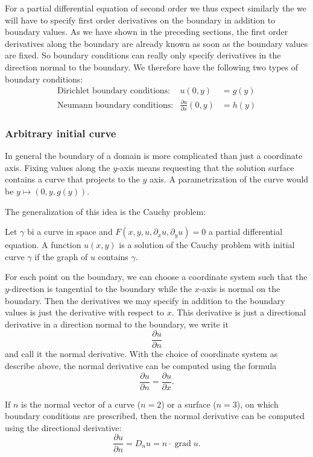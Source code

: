 For a partial differential equation of second order we thus expect 
similarly the we will have to specify first order derivatives on the
boundary in addition to boundary values.
As we have shown in the preceding sections, the first order derivatives
along the boundary are already known as soon as the boundary values are
fixed.
So boundary conditions can really only specify derivatives in the direction
normal to the boundary.
We therefore have the following two types of boundary conditions:
\begin{align}
&\text{Dirichlet boundary conditions:}&
u(0,y)&=g(y)&
\label{klassifikation:dirichlet-randbedingung}
\\
&\text{Neumann boundary conditions:}&
\frac{\partial u}{\partial x}(0,y)&=h(y)
\label{klassifikation:neumann-randbedingung}
\end{align}

\subsubsection{Arbitrary initial curve}
In general the boundary of a domain is more complicated than just 
a coordinate axis.
Fixing values along the $y$-axis means requesting that the solution
surface contains a curve that projects to the $y$ axis.
A parametrization of the curve would be $y\mapsto (0,y,g(y))$.

The generalization of this idea is the Cauchy problem:

\begin{problem}
Let $\gamma$ bi a curve in space and 
$F(x,y,u,\partial_xu,\partial_yu)=0$ a partial differential equation.
A function $u(x,y)$ is a solution of the Cauchy problem with initial
curve $\gamma$ if the graph of $u$ contains $\gamma$.
\end{problem}

For each point on the boundary, we can choose a coordinate system such
that the $y$-direction is tangential to the boundary while the $x$-axis
is normal on the boundary.
Then the derivatives we may specify in addition to the boundary
values is just the derivative with respect to $x$.
This derivative is just a directional derivative in a direction normal
to the boundary, we write it
\[
\frac{\partial u}{\partial n}
\]
and call it the normal derivative.
With the choice of coordinate system as describe above, the normal
derivative can be computed using the formula
\[
\frac{\partial u}{\partial n}
=\frac{\partial u}{\partial x}.
\]

If $n$ is the normal vector of a curve ($n=2$) or a surface ($n=3$),
on which boundary conditions are prescribed, then the normal derivative
can be computed using the directional derivative:
\[
\frac{\partial u}{\partial n}=D_nu = n\cdot \operatorname{grad} u.
\]

